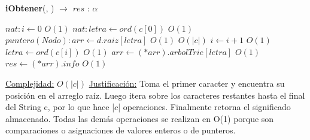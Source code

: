 \begin{algorithm}[H]{\textbf{iObtener}(, ) $\to$ $res$ : $\alpha$}
	\begin{algorithmic}
		\State $nat: i \gets 0$ \Comment $O(1)$
		\State $nat: letra \gets ord(c[0])$ \Comment $O(1)$
		\State $puntero(Nodo): arr \gets d.raiz[letra]$ \Comment $O(1)$
		 \Comment $O(|c|)$
			\State $i \gets i + 1$ \Comment $O(1)$
			\State $letra \gets ord(c[i])$ \Comment $O(1)$
			\State $arr \gets (*arr).arbolTrie[letra]$ \Comment $O(1)$
		\EndWhile
		\State $res \gets (*arr).info$ \Comment $O(1)$

		\medskip
		\Statex \underline{Complejidad:} $O(|c|)$
		\Statex \underline{Justificación:} Toma el primer caracter y encuentra su posición en el arreglo raíz. Luego itera sobre los caracteres restantes hasta el final del String c, por lo que hace |$c$| operaciones. Finalmente retorna el significado almacenado. Todas las demás operaciones se realizan en O(1) porque son comparaciones o asignaciones de valores enteros o de punteros.
    \end{algorithmic}
\end{algorithm}



